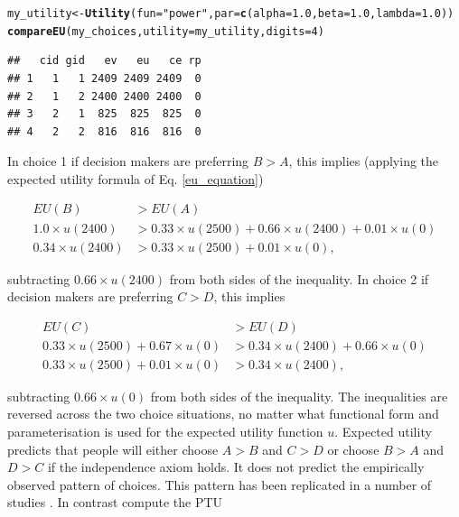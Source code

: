 \documentclass{article}\usepackage[]{graphicx}\usepackage[]{color}
\makeatletter
\newcommand{\hlnum}[1]{\textcolor[rgb]{0.686,0.059,0.569}{#1}}%
\newcommand{\hlstr}[1]{\textcolor[rgb]{0.192,0.494,0.8}{#1}}%
\newcommand{\hlstd}[1]{\textcolor[rgb]{0.345,0.345,0.345}{#1}}%
\newcommand{\hlkwb}[1]{\textcolor[rgb]{0.69,0.353,0.396}{#1}}%
\newcommand{\hlkwc}[1]{\textcolor[rgb]{0.333,0.667,0.333}{#1}}%
\newcommand{\hlkwd}[1]{\textcolor[rgb]{0.737,0.353,0.396}{\textbf{#1}}}%
\newenvironment{kframe}{%
 \def\at@end@of@kframe{}%
 \ifinner\ifhmode%
  \def\at@end@of@kframe{\end{minipage}}%
  \begin{minipage}{\columnwidth}%
 \fi\fi%
 \def\FrameCommand##1{\hskip\@totalleftmargin \hskip-\fboxsep
 \colorbox{shadecolor}{##1}\hskip-\fboxsep
     \hskip-\linewidth \hskip-\@totalleftmargin \hskip\columnwidth}%
 \MakeFramed {\advance\hsize-\width
   \@totalleftmargin\z@ \linewidth\hsize
   \@setminipage}}%
 {\par\unskip\endMakeFramed%
 \at@end@of@kframe}
\newenvironment{knitrout}{}{} %
\makeatother
\begin{document}
\begin{knitrout}
\color{fgcolor}\begin{kframe}
\begin{alltt}
\hlstd{my_utility} \hlkwb{<-} \hlkwd{Utility}\hlstd{(}\hlkwc{fun}\hlstd{=}\hlstr{"power"}\hlstd{,} \hlkwc{par}\hlstd{=}\hlkwd{c}\hlstd{(}\hlkwc{alpha}\hlstd{=}\hlnum{1.0}\hlstd{,} \hlkwc{beta}\hlstd{=}\hlnum{1.0}\hlstd{,} \hlkwc{lambda}\hlstd{=}\hlnum{1.0}\hlstd{))}
\hlkwd{compareEU}\hlstd{(my_choices,} \hlkwc{utility}\hlstd{=my_utility,} \hlkwc{digits}\hlstd{=}\hlnum{4}\hlstd{)}
\end{alltt}
\begin{verbatim}
##   cid gid   ev   eu   ce rp
## 1   1   1 2409 2409 2409  0
## 2   1   2 2400 2400 2400  0
## 3   2   1  825  825  825  0
## 4   2   2  816  816  816  0
\end{verbatim}
\end{kframe}
\end{knitrout}


In choice 1 if decision makers are preferring $B > A$, this implies (applying the expected utility formula of Eq. \eqref{eu_equation})

\begin{equation}
\begin{split}
EU(B) &> EU(A)\\
1.0 \times u(2400) &> 0.33 \times u(2500) + 0.66 \times u(2400) + 0.01 \times u(0)\\
0.34 \times u(2400) &> 0.33 \times u(2500) + 0.01 \times u(0),
\end{split}
\end{equation}

subtracting $0.66 \times u(2400)$ from both sides of the inequality.
In choice 2 if decision makers are preferring $C > D$, this implies

\begin{equation}
\begin{split}
EU(C) &> EU(D)\\
0.33 \times u(2500) + 0.67 \times u(0) &> 0.34 \times u(2400) + 0.66 \times u(0)\\
0.33 \times u(2500) + 0.01 \times u(0) &> 0.34 \times u(2400),
\end{split}
\end{equation}

subtracting $0.66 \times u(0)$ from both sides of the inequality.
The inequalities are reversed across the two choice situations, no matter what functional form and parameterisation is used for the expected utility function $u$. Expected utility predicts that people will either choose $A > B$ and $C > D$ or choose $B > A$ and $D > C$ if the independence axiom holds. It does not predict the empirically observed pattern of choices. This pattern has been replicated in a number of studies \cite[e.g. see][]{MacCrimmon_Larsson_1979}. In contrast compute the PTU
\end{document}
